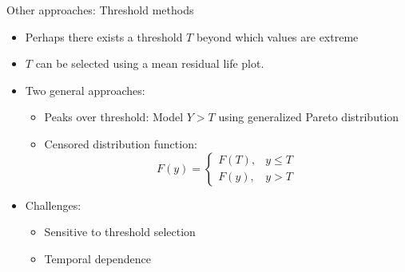 \documentclass{beamer}
\begin{document}
\begin{frame}{Other approaches: Threshold methods}
	\begin{itemize} \setlength{\itemsep}{1em}
		\item Perhaps there exists a threshold $T$ beyond which values are extreme
		\item $T$ can be selected using a mean residual life plot.
		\item Two general approaches:
		\begin{itemize} \setlength{\itemsep}{0.5em}
			\item Peaks over threshold: Model $Y > T$ using generalized Pareto distribution
			\item Censored distribution function: $$F(y) = \begin{cases}
				F(T), & y \le T \\
				F(y), & y > T
			\end{cases}$$
		\end{itemize}
		\item Challenges: \vspace{0.5em}
		\begin{itemize} \setlength{\itemsep}{0.5em}
			\item Sensitive to threshold selection
			\item Temporal dependence
		\end{itemize}
	\end{itemize}
\end{frame}

\end{document}
